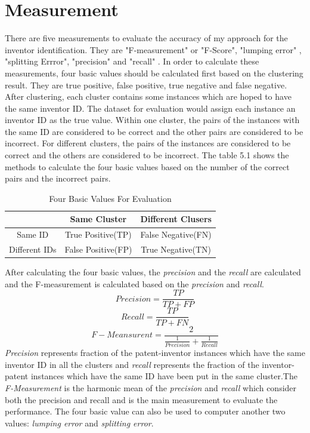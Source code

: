 \section{Measurement}
There are five measurements to evaluate the accuracy of my approach for the inventor identification. They are "F-measurement" or "F-Score", "lumping error" , "splitting Errror", "precision" and "recall" .  In order to calculate these measurements, four basic values should be calculated first based on the clustering result. They are true positive, false positive, true negative and false negative.  After clustering, each cluster contains some instances which are hoped to have the same inventor ID. The dataset for evaluation would assign each instance an inventor ID as the true value.  Within one cluster, the pairs of the instances with the same ID are considered to be correct and the other pairs are considered to be incorrect. For different clusters, the pairs of the instances are considered to be correct and the others are considered to be incorrect. The table 5.1 shows the methods to calculate the four basic values based on the number of the correct pairs and the incorrect pairs.
\begin{table}
\centering
\begin{tabular}{|c|c|c|}
\hline
 & Same Cluster & Different Clusers \\
 \hline
 Same ID & True Positive(TP) & False Negative(FN)  \\
 \hline
Different IDs & False Positive(FP) & True Negative(TN) \\
\hline
\end{tabular}
\caption{Four Basic Values For Evaluation}
\end{table}
After calculating the four basic values, the \emph{precision} and the \emph{recall} are calculated and the F-measurement is calculated based on the \emph{precision} and \emph{recall}. 
\begin{equation}
Precision =\frac{TP}{TP+FP}
\end{equation} 
\begin{equation}
Recall =\frac{TP}{TP+FN}
\end{equation} 
\begin{equation}
F-Meansurent= \frac{2}{\frac{1}{Precision}+\frac{1}{Recall}}
\end{equation}
\emph{Precision} represents fraction of the patent-inventor instances which have the same inventor ID in all the clusters and \emph{recall} represents the fraction of the inventor-patent instances which have the same ID have been put in the same cluster.The \emph{F-Measurement} is the harmonic mean of the \emph{precision} and \emph{recall} which consider both the precision and recall and is the main measurement to evaluate the performance.  The four basic value can also be used to computer another two values: \emph{lumping error} and \emph{splitting error}.
